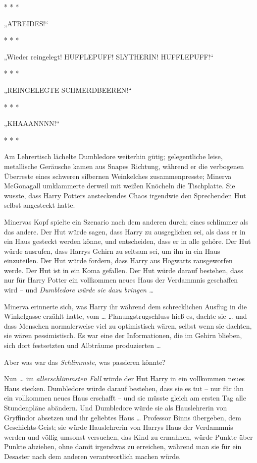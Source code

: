 {* * *

„ATREIDES!“

* * *

„Wieder reingelegt! HUFFLEPUFF! SLYTHERIN! HUFFLEPUFF!“

* * *

„REINGELEGTE SCHMERDBEEREN!“

* * *

„KHAAANNNN!“

* * *

Am Lehrertisch lächelte Dumbledore weiterhin gütig; gelegentliche leise, metallische Geräusche kamen aus Snapes Richtung, während er die verbogenen Überreste eines schweren silbernen Weinkelches zusammenpresste; Minerva McGonagall umklammerte derweil mit weißen Knöcheln die Tischplatte. Sie wusste, dass Harry Potters ansteckendes Chaos irgendwie den Sprechenden Hut selbst angesteckt hatte.

Minervas Kopf spielte ein Szenario nach dem anderen durch; eines schlimmer als das andere. Der Hut würde sagen, dass Harry zu ausgeglichen sei, als dass er in ein Haus gesteckt werden könne, und entscheiden, dass er in alle gehöre. Der Hut würde ausrufen, dass Harrys Gehirn zu seltsam sei, um ihn in ein Haus einzuteilen. Der Hut würde fordern, dass Harry aus Hogwarts rausgeworfen werde. Der Hut ist in ein Koma gefallen. Der Hut würde darauf bestehen, dass nur für Harry Potter ein vollkommen neues Haus der Verdammnis geschaffen wird -- und \emph{Dumbledore würde sie dazu bringen …}

Minerva erinnerte sich, was Harry ihr während dem schrecklichen Ausflug in die Winkelgasse erzählt hatte, vom … Planungstrugschluss hieß es, dachte sie … und dass Menschen normalerweise viel zu optimistisch wären, selbst wenn sie dachten, sie wären pessimistisch. Es war eine der Informationen, die im Gehirn blieben, sich dort festsetzten und Albträume produzierten …

Aber was war das \emph{Schlimmste,} was passieren könnte?

Nun … im \emph{allerschlimmsten Fall} würde der Hut Harry in ein vollkommen neues Haus stecken. Dumbledore würde darauf bestehen, dass sie es tut -- nur für ihn ein vollkommen neues Haus erschafft -- und sie müsste gleich am ersten Tag alle Stundenpläne abändern. Und Dumbledore würde sie als Hauslehrerin von Gryffindor absetzen und ihr geliebtes Haus … Professor Binns übergeben, dem Geschichts-Geist; sie würde Hauslehrerin von Harrys Haus der Verdammnis werden und völlig umsonst versuchen, das Kind zu ermahnen, würde Punkte über Punkte abziehen, ohne damit irgendwas zu erreichen, während man sie für ein Desaster nach dem anderen verantwortlich machen würde.

}
